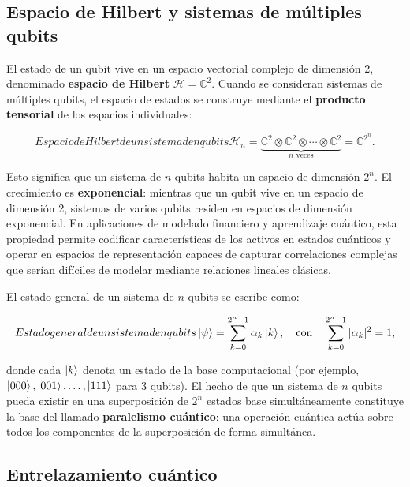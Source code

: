 \subsection{Espacio de Hilbert y sistemas de múltiples qubits}
\label{ap:subsec:espacio_hilbert}

El estado de un qubit vive en un espacio vectorial complejo de dimensión 2, denominado \textbf{espacio de Hilbert} $\mathcal{H} = \mathbb{C}^2$. Cuando se consideran sistemas de múltiples qubits, el espacio de estados se construye mediante el \textbf{producto tensorial} de los espacios individuales:

\begin{equation}[ap:eq:producto_tensorial]{Espacio de Hilbert de un sistema de n qubits}
\mathcal{H}_n = \underbrace{\mathbb{C}^2 \otimes \mathbb{C}^2 \otimes \cdots \otimes \mathbb{C}^2}_{n \text{ veces}} = \mathbb{C}^{2^n}.
\end{equation}

Esto significa que un sistema de $n$ qubits habita un espacio de dimensión $2^n$. El crecimiento es \textbf{exponencial}: mientras que un qubit vive en un espacio de dimensión 2, sistemas de varios qubits residen en espacios de dimensión exponencial. En aplicaciones de modelado financiero y aprendizaje cuántico, esta propiedad permite codificar características de los activos en estados cuánticos y operar en espacios de representación capaces de capturar correlaciones complejas que serían difíciles de modelar mediante relaciones lineales clásicas.

El estado general de un sistema de $n$ qubits se escribe como:

\begin{equation}[ap:eq:estadonqubits]{Estado general de un sistema de n qubits}
\ket{\psi} = \sum_{k=0}^{2^{n} - 1} {\alpha}_{k} \ket{k}, \quad \text{con} \quad \sum_{k=0}^{2^{n} - 1} |{\alpha}_{k}|^{2} = 1,
\end{equation}

donde cada $\ket{k}$ denota un estado de la base computacional (por ejemplo, $\ket{000}, \ket{001}, \ldots, \ket{111}$ para 3 qubits). El hecho de que un sistema de $n$ qubits pueda existir en una superposición de $2^n$ estados base simultáneamente constituye la base del llamado \textbf{paralelismo cuántico}: una operación cuántica actúa sobre todos los componentes de la superposición de forma simultánea.

\subsection{Entrelazamiento cuántico}
\label{ap:subsec:entrelazamiento}


